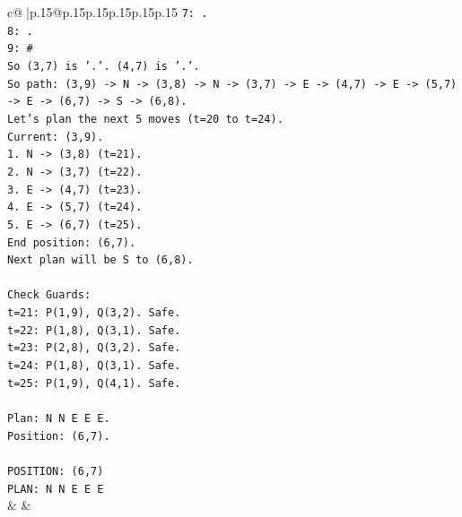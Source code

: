 \documentclass{article}
\begin{document}
{\begin{supertabular}{c@{$\;$}|p{.15\linewidth}@{}p{.15\linewidth}p{.15\linewidth}p{.15\linewidth}p{.15\linewidth}p{.15\linewidth}}
{{{\texttt{7: .} \\
\texttt{8: .} \\
\texttt{9: \#} \\
\texttt{So (3,7) is '.'. (4,7) is '.'.} \\
\texttt{So path: (3,9) {-}> N {-}> (3,8) {-}> N {-}> (3,7) {-}> E {-}> (4,7) {-}> E {-}> (5,7) {-}> E {-}> (6,7) {-}> S {-}> (6,8).} \\
\texttt{Let's plan the next 5 moves (t=20 to t=24).} \\
\texttt{Current: (3,9).} \\
\texttt{1. N {-}> (3,8) (t=21).} \\
\texttt{2. N {-}> (3,7) (t=22).} \\
\texttt{3. E {-}> (4,7) (t=23).} \\
\texttt{4. E {-}> (5,7) (t=24).} \\
\texttt{5. E {-}> (6,7) (t=25).} \\
\texttt{End position: (6,7).} \\
\texttt{Next plan will be S to (6,8).} \\
\\ 
\texttt{Check Guards:} \\
\texttt{t=21: P(1,9), Q(3,2). Safe.} \\
\texttt{t=22: P(1,8), Q(3,1). Safe.} \\
\texttt{t=23: P(2,8), Q(3,2). Safe.} \\
\texttt{t=24: P(1,8), Q(3,1). Safe.} \\
\texttt{t=25: P(1,9), Q(4,1). Safe.} \\
\\ 
\texttt{Plan: N N E E E.} \\
\texttt{Position: (6,7).} \\
\\ 
\texttt{POSITION: (6,7)} \\
\texttt{PLAN: N N E E E} \\
            }
        }
    }
    & & \\ \\


\end{supertabular}}
\end{document}
